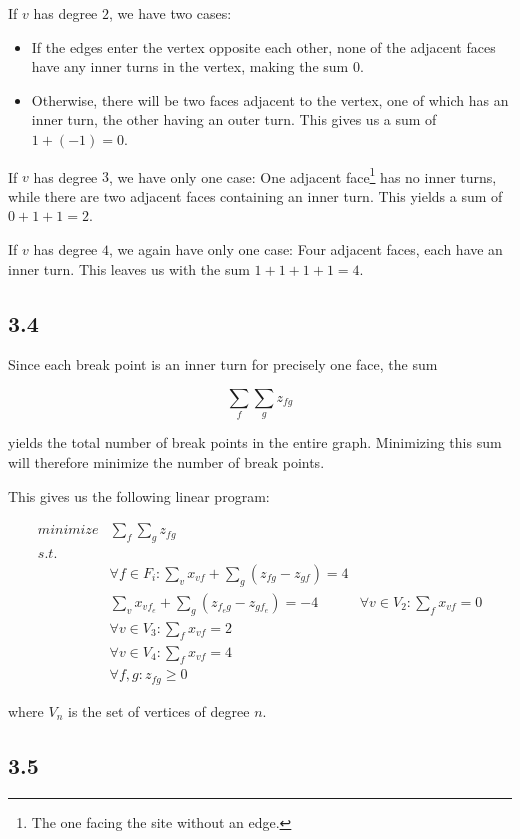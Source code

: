 \documentclass[11pt,a4paper]{article}
\begin{document}
If $v$ has degree $2$, we have two cases:

\begin{itemize}
    \item If the edges enter the vertex opposite each other, none of the
          adjacent faces have any inner turns in the vertex, making the sum $0$.
    \item Otherwise, there will be two faces adjacent to the vertex, one of
          which has an inner turn, the other having an outer turn. This gives us a
          sum of $1 + (-1) = 0$.
\end{itemize}

If $v$ has degree $3$, we have only one case: One adjacent face\footnote{The
one facing the site without an edge.} has no inner turns, while there are two
adjacent faces containing an inner turn. This yields a sum of $0+1+1 = 2$.

If $v$ has degree $4$, we again have only one case: Four adjacent faces, each
have an inner turn. This leaves us with the sum $1+1+1+1=4$.

\subsection{3.4}
Since each break point is an inner turn for precisely one face, the sum

\[
    \sum_f \sum_g z_{fg}
\]

yields the total number of break points in the entire graph. Minimizing this
sum will therefore minimize the number of break points.

This gives us the following linear program:

\begin{align*}
    minimize & \sum_f \sum_g z_{fg} \\
    s.t.     & \\
             & \forall f \in F_i: \sum_v x_{vf} + \sum_g (z_{fg} - z_{gf}) = 4 \\
             & \sum_v x_{vf_e} + \sum_g (z_{f_eg} - z_{gf_e}) = -4
             & \forall v \in V_2: \sum_f x_{vf} = 0 \\
             & \forall v \in V_3: \sum_f x_{vf} = 2 \\
             & \forall v \in V_4: \sum_f x_{vf} = 4 \\
             & \forall f, g: z_{fg} \geq 0 
\end{align*}

where $V_n$ is the set of vertices of degree $n$.

\subsection{3.5}



\end{document}
